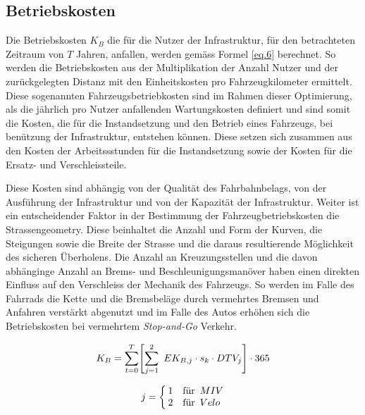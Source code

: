 

\newpage

\subsection*{Betriebskosten}
\label{sub:Betrieb}


Die Betriebskosten $K_{B}$ die für die Nutzer der Infrastruktur, für den betrachteten Zeitraum von $T$ Jahren, anfallen, werden gemäss Formel \ref{eq.6} berechnet. So werden die Betriebskosten aus der Multiplikation der Anzahl Nutzer und der zurückgelegten Distanz mit den Einheitskosten pro Fahrzeugkilometer ermittelt.
Diese sogenannten Fahrzeugsbetriebkosten sind im Rahmen dieser Optimierung, als die jährlich pro Nutzer anfallenden Wartungskosten definiert und sind somit die Kosten, die für die Instandsetzung und den Betrieb eines Fahrzeugs, bei benützung der Infrastruktur, entstehen können. Diese setzen sich zusammen aus den Kosten der Arbeitssstunden für die Instandsetzung sowie der Kosten für die Ersatz- und Verschleissteile.
 
Diese Kosten sind abhängig von der Qualität des Fahrbahnbelags, von der Ausführung der Infrastruktur und von der Kapazität der Infrastruktur. Weiter ist ein entscheidender Faktor in der Bestimmung der Fahrzeugbetriebskosten die Strassengeometry. Diese beinhaltet die Anzahl und Form der Kurven, die Steigungen sowie die Breite der Strasse und die daraus resultierende Möglichkeit des sicheren Überholens. Die Anzahl an Kreuzungsstellen und die davon abhänginge Anzahl an Brems- und Beschleunigungsmanöver haben einen direkten Einfluss auf den Verschleiss der Mechanik des Fahrzeugs. So werden im Falle des Fahrrads die Kette und die Bremsbeläge durch vermehrtes Bremsen und Anfahren verstärkt abgenutzt und im Falle des Autos erhöhen sich die Betriebskosten bei vermehrtem \textit{Stop-and-Go} Verkehr.

\begin{equation}
K_{B} =  \sum_{t=0}^T \Biggl[ \sum_{j=1}^2 \ EK_{B,j} \cdot s_{k} \cdot DTV_{j} \Biggr] \cdot 365  \label{eq.6} \\
\end{equation}

\begin{align*}
	 j &=
      \begin{cases}
        \begin{aligned}
          & 1 \\
          & 2
        \end{aligned} &
        \begin{aligned}
         & \text{für}\ \thinspace \\
         & \text{für}\ \thinspace
        \end{aligned}
        \begin{aligned}
          & MIV \\
          & Velo
        \end{aligned}
      \end{cases} \\
\end{align*}

